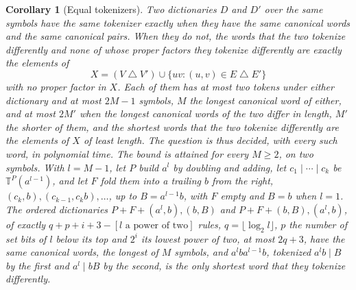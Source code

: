 \documentclass[11pt,a4paper]{article}
\theoremstyle{definition}
\theoremstyle{plain}
\newtheorem{corollary}{Corollary}
\newcommand{\T}{\mathbb{T}}
\begin{document}
\begin{corollary}[Equal tokenizers]\label{cor:equivalence}
Two dictionaries \(D\) and \(D'\) over the same symbols have the same tokenizer exactly when they have the same
canonical words and the same canonical pairs. When they do not, the words that the two tokenize differently and none of
whose proper factors they tokenize differently are exactly the elements of
\[
X = (V \mathbin{\triangle} V') \cup \{uv : (u, v) \in E \mathbin{\triangle} E'\}
\]
with no proper factor in \(X\). Each of them has at most two tokens under either dictionary and at most \(2M - 1\)
symbols, \(M\) the longest canonical word of either, and at most \(2M'\) when the longest canonical words of the two
differ in length, \(M'\) the shorter of them, and the shortest words that the two tokenize differently are the elements
of \(X\) of least length. The question is thus decided, with every such word, in polynomial time. The bound is attained
for every \(M \ge 2\), on two symbols. With \(l = M - 1\), let \(P\) build \(a^l\) by doubling and adding, let
\(c_1 \mid \cdots \mid c_k\) be \(\T^P(a^{l-1})\), and let \(F\) fold them into a trailing \(b\) from the right,
\((c_k, b), (c_{k-1}, c_k b), \dots\), up to \(B = a^{l-1} b\), with \(F\) empty and \(B = b\) when \(l = 1\). The
ordered dictionaries \(P + F + (a^l, b), (b, B)\) and \(P + F + (b, B), (a^l, b)\), of exactly
\(q + p + i + 3 - [l \text{ a power of two}]\) rules, \(q = \lfloor \log_2 l \rfloor\), \(p\) the number of set bits of
\(l\) below its top and \(2^i\) its lowest power of two, at most \(2q + 3\), have the same canonical words, the longest
of \(M\) symbols, and \(a^l b a^{l-1} b\), tokenized \(a^l b \mid B\) by the first and \(a^l \mid bB\) by the second, is
the only shortest word that they tokenize differently.
\end{corollary}
\end{document}
